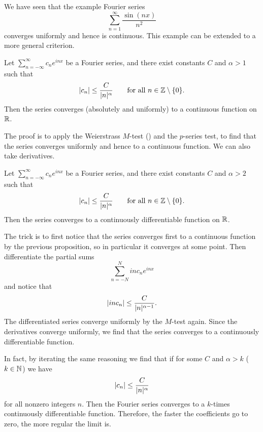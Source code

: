 We have seen that the example Fourier series 
\begin{equation*}
\sum_{n=1}^\infty \frac{\sin(nx)}{n^2}
\end{equation*}
converges uniformly and hence is continuous.  This 
example can be extended to a more general criterion.

\begin{prop}
Let $\sum_{n=-\infty}^\infty c_n e^{inx}$ be a Fourier series,
and there exist constants $C$ and $\alpha > 1$ such that
\begin{equation*}
\lvert {c_n} \rvert \leq \frac{C}{\lvert {n} \rvert^\alpha}
\qquad \text{for all $n \in {\mathbb{Z}} \setminus \{ 0 \}$}.
\end{equation*}
Then the series converges (absolutely and uniformly) to a continuous function on ${\mathbb{R}}$.
\end{prop}

The proof is to apply the Weierstrass $M$-test () and
the $p$-series test, to find that the series converges uniformly and hence
to a continuous function.
We can also take derivatives.

\begin{prop}
Let $\sum_{n=-\infty}^\infty c_n e^{inx}$ be a Fourier series,
and there exist constants $C$ and $\alpha > 2$ such that
\begin{equation*}
\lvert {c_n} \rvert \leq \frac{C}{\lvert {n} \rvert^\alpha}
\qquad \text{for all $n \in {\mathbb{Z}} \setminus \{ 0 \}$}.
\end{equation*}
Then the series converges to a continuously differentiable function on ${\mathbb{R}}$.
\end{prop}

The trick is to first notice that the series converges first to a continuous
function by the previous proposition, so in particular it converges at some
point.  Then differentiate the partial sums
\begin{equation*}
\sum_{n=-N}^{N}
i n c_n e^{inx}
\end{equation*}
and notice that 
\begin{equation*}
\lvert {in c_n} \rvert \leq \frac{C}{\lvert {n} \rvert^{\alpha-1}} .
\end{equation*}
The differentiated series converge uniformly by the $M$-test again.  Since
the derivatives converge uniformly, we find that the series converges 
to a continuously differentiable function.

In fact, by iterating the same reasoning we find that if
for some $C$ and $\alpha > k$ ($k \in {\mathbb{N}}$) we have
\begin{equation*}
\lvert {c_n} \rvert 
\leq \frac{C}{\lvert {n} \rvert^\alpha}
\end{equation*}
for all nonzero integers $n$.  Then 
the Fourier series converges to a $k$-times continuously differentiable
function.  Therefore, the faster the coefficients go to zero, the more
regular the limit is.

